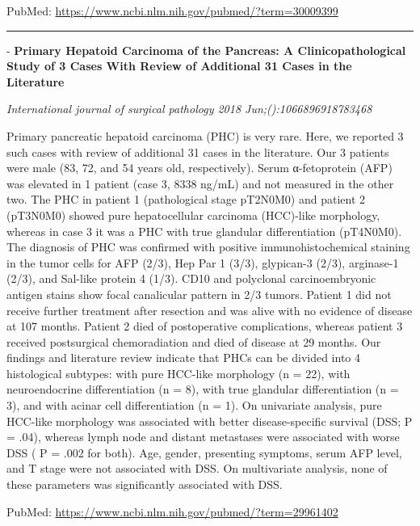 \documentclass[]{article}
\begin{document}
PubMed: \url{https://www.ncbi.nlm.nih.gov/pubmed/?term=30009399}

{}

{}

\begin{center}\rule{0.5\linewidth}{\linethickness}\end{center}

 - \textbf{Primary Hepatoid Carcinoma of the Pancreas: A
Clinicopathological Study of 3 Cases With Review of Additional 31 Cases
in the Literature}

\emph{International journal of surgical pathology 2018
Jun;():1066896918783468}

Primary pancreatic hepatoid carcinoma (PHC) is very rare. Here, we
reported 3 such cases with review of additional 31 cases in the
literature. Our 3 patients were male (83, 72, and 54 years old,
respectively). Serum α-fetoprotein (AFP) was elevated in 1 patient (case
3, 8338 ng/mL) and not measured in the other two. The PHC in patient 1
(pathological stage pT2N0M0) and patient 2 (pT3N0M0) showed pure
hepatocellular carcinoma (HCC)-like morphology, whereas in case 3 it was
a PHC with true glandular differentiation (pT4N0M0). The diagnosis of
PHC was confirmed with positive immunohistochemical staining in the
tumor cells for AFP (2/3), Hep Par 1 (3/3), glypican-3 (2/3), arginase-1
(2/3), and Sal-like protein 4 (1/3). CD10 and polyclonal
carcinoembryonic antigen stains show focal canalicular pattern in 2/3
tumors. Patient 1 did not receive further treatment after resection and
was alive with no evidence of disease at 107 months. Patient 2 died of
postoperative complications, whereas patient 3 received postsurgical
chemoradiation and died of disease at 29 months. Our findings and
literature review indicate that PHCs can be divided into 4 histological
subtypes: with pure HCC-like morphology (n = 22), with neuroendocrine
differentiation (n = 8), with true glandular differentiation (n = 3),
and with acinar cell differentiation (n = 1). On univariate analysis,
pure HCC-like morphology was associated with better disease-specific
survival (DSS; P = .04), whereas lymph node and distant metastases were
associated with worse DSS ( P = .002 for both). Age, gender, presenting
symptoms, serum AFP level, and T stage were not associated with DSS. On
multivariate analysis, none of these parameters was significantly
associated with DSS.

PubMed: \url{https://www.ncbi.nlm.nih.gov/pubmed/?term=29961402}

{}
\end{document}
